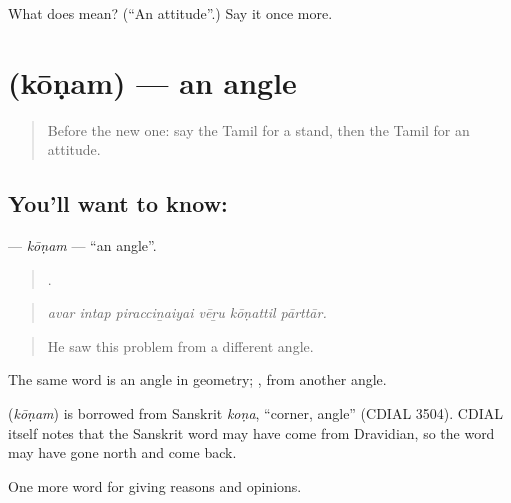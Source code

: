 \begin{tcolorbox}[breakable,colback=teal!4,colframe=teal!35!black,title={Before you move on}]
What does  mean? (\textquotedblleft{}An attitude\textquotedblright{}.) Say it once more.
\end{tcolorbox}
\section[\texorpdfstring{\ta{கோணம்} (kōṇam)}{கோணம் (kōṇam)}]{ (kōṇam) — an angle}

\label{lesson:TA-C350-konam}



\begin{quote}
Before the new one: say the Tamil for a stand, then the Tamil for an attitude.
\end{quote}

\subsection*{You'll want to know: }
\textbf{} — \emph{kōṇam} — \textquotedblleft{}an angle\textquotedblright{}.

\begin{quote}
     .
\end{quote}

\begin{quote}
\emph{avar intap piracciṉaiyai vēṟu kōṇattil pārttār.}
\end{quote}

\begin{quote}
He saw this problem from a different angle.
\end{quote}

The same word is an angle in geometry;  , from another angle.

\begin{cousinweb}
\textbf{} (\emph{kōṇam}) is borrowed from Sanskrit \emph{koṇa}, \textquotedblleft{}corner, angle\textquotedblright{} (CDIAL 3504). CDIAL itself notes that the Sanskrit word may have come from Dravidian, so the word may have gone north and come back.
\end{cousinweb}

\begin{grammarlens}[title={What you've built}]
One more word for giving reasons and opinions.
\end{grammarlens}

